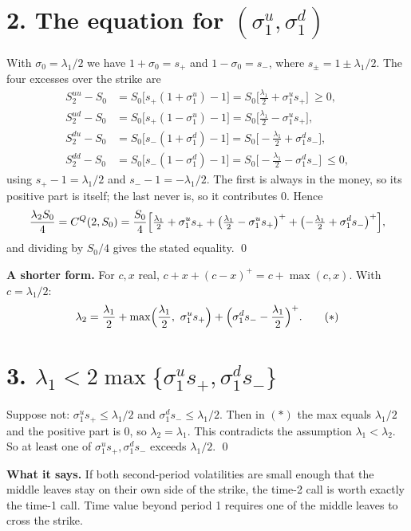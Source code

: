 \documentclass[12pt]{article}
\newcommand{\1}{\mathbf{1}}
\theoremstyle{remark}
\newcommand{\su}{\sigma_1^u}
\newcommand{\sd}{\sigma_1^d}
\begin{document}
\section*{2. The equation for $(\su,\sd)$}
With $\sigma_0=\lambda_1/2$ we have $1+\sigma_0=s_+$ and $1-\sigma_0=s_-$, where $s_\pm=1\pm\lambda_1/2$.
The four excesses over the strike are
\begin{align*}
S_2^{uu}-S_0&=S_0\bigl[s_+(1+\su)-1\bigr]=S_0\bigl[\tfrac{\lambda_1}2+\su s_+\bigr]\ \ge0,\\
S_2^{ud}-S_0&=S_0\bigl[s_+(1-\su)-1\bigr]=S_0\bigl[\tfrac{\lambda_1}2-\su s_+\bigr],\\
S_2^{du}-S_0&=S_0\bigl[s_-(1+\sd)-1\bigr]=S_0\bigl[-\tfrac{\lambda_1}2+\sd s_-\bigr],\\
S_2^{dd}-S_0&=S_0\bigl[s_-(1-\sd)-1\bigr]=S_0\bigl[-\tfrac{\lambda_1}2-\sd s_-\bigr]\ \le0,
\end{align*}
using $s_+-1=\lambda_1/2$ and $s_--1=-\lambda_1/2$. The first is always in the money, so its
positive part is itself; the last never is, so it contributes $0$. Hence
\[
\frac{\lambda_2S_0}4=C^Q(2,S_0)=\frac{S_0}4\Bigl[\tfrac{\lambda_1}2+\su s_++\bigl(\tfrac{\lambda_1}2-\su s_+\bigr)^++\bigl(-\tfrac{\lambda_1}2+\sd s_-\bigr)^+\Bigr],
\]
and dividing by $S_0/4$ gives the stated equality. \qed

\textbf{A shorter form.} For $c,x$ real, $c+x+(c-x)^+=c+\max(c,x)$. With $c=\lambda_1/2$:
\[
\lambda_2=\frac{\lambda_1}2+\max\Bigl(\frac{\lambda_1}2,\ \su s_+\Bigr)+\Bigl(\sd s_--\frac{\lambda_1}2\Bigr)^+.\tag{$\ast$}
\]

\section*{3. $\lambda_1<2\max\{\su s_+,\sd s_-\}$}
Suppose not: $\su s_+\le\lambda_1/2$ and $\sd s_-\le\lambda_1/2$. Then in $(\ast)$ the max equals
$\lambda_1/2$ and the positive part is $0$, so $\lambda_2=\lambda_1$. This contradicts the assumption
$\lambda_1<\lambda_2$. So at least one of $\su s_+,\sd s_-$ exceeds $\lambda_1/2$. \qed

\textbf{What it says.} If both second-period volatilities are small enough that the middle leaves stay
on their own side of the strike, the time-2 call is worth exactly the time-1 call. Time value
beyond period 1 requires one of the middle leaves to cross the strike.
\end{document}
